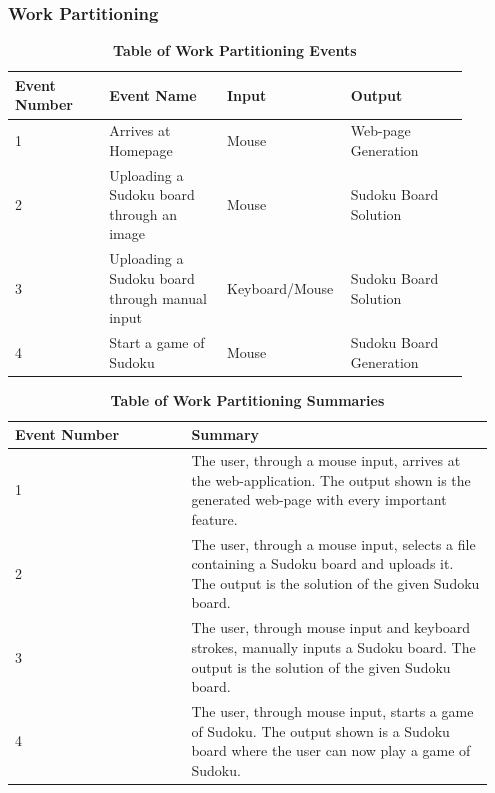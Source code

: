 \documentclass[11pt]{article}
\begin{document}
\subsubsection{Work Partitioning}
\begin{table}[H]
\caption{\bf Table of Work Partitioning Events}
\label{tab:my-table}
\begin{tabular}{p{0.2\linewidth} | p{0.25\linewidth} | p{0.2\linewidth} | p{0.25\linewidth}}
\hline
\textbf{Event Number} & \textbf{Event Name} & \textbf{Input} & \textbf{Output} \\ \hline
1 & Arrives at Homepage     & Mouse          & Web-page Generation   \\ \hline
2 & Uploading a Sudoku board through an image     & Mouse          & Sudoku Board Solution   \\ \hline
3 & Uploading a Sudoku board through manual input & Keyboard/Mouse & Sudoku Board Solution   \\ \hline
4 & Start a game of Sudoku                        & Mouse          & Sudoku Board Generation \\ \hline
\end{tabular}%
\end{table}

\begin{table}[H]
\caption{\bf Table of Work Partitioning Summaries}
\label{tab:my-table}
\begin{tabular}{p{0.35\linewidth} | p{0.6\linewidth}}
\hline
\textbf{Event Number} & \textbf{Summary}  \\ \hline
1 & The user, through a mouse input, arrives at the web-application. The output shown is the generated web-page with every important feature.  \\ \hline
2 & The user, through a mouse input, selects a file containing a Sudoku board and uploads it. The output is the solution of the given Sudoku board.    \\ \hline
3 & The user, through mouse input and keyboard strokes, manually inputs a Sudoku board. The output is the solution of the given Sudoku board.  \\ \hline
4 & The user, through mouse input, starts a game of Sudoku. The output shown is a Sudoku board where the user can now play a game of Sudoku.\\ \hline
\end{tabular}%
\end{table}

\newpage
\end{document}

